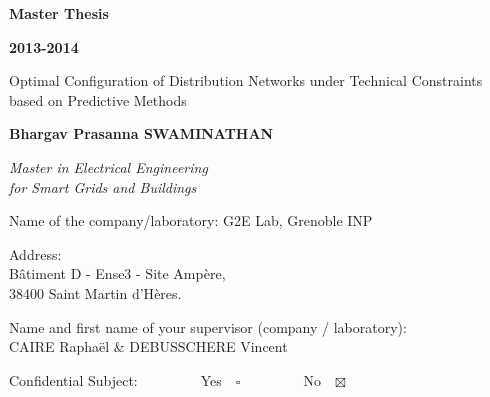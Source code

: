\documentclass{article}
\begin{document}
\thispagestyle{empty}
\begingroup
\centering
\begin{figure}[!h]
\centering
 \newlength\figureheight
    \newlength\figurewidth
    \setlength\figureheight{3.63cm}
    \setlength\figurewidth{5.53cm}
    
\end{figure}
 \fontsize {24pt}{24pt}\selectfont
{\bfseries Master Thesis\par}

\vspace*{.02\textheight}

 \fontsize {24pt}{24pt}\selectfont
{\bfseries 2013-2014\par}

\vspace*{.06\textheight}

 \fontsize {16pt}{24pt}\selectfont
{Optimal Configuration of Distribution Networks under Technical Constraints based on Predictive Methods\par}

\vspace*{.03\textheight}

 \fontsize {14pt}{24pt}\selectfont
{\bfseries Bhargav Prasanna SWAMINATHAN\par}

\vspace*{.06\textheight}

 \fontsize {24pt}{30pt}\selectfont
{\itshape Master in Electrical Engineering\\ for Smart Grids and Buildings\par}

\vspace*{.08\textheight}

\flushleft
{} \fontsize {14pt}{24pt}\selectfont
{Name of the company/laboratory: G2E Lab, Grenoble INP\par}

\vspace*{.04\textheight}

 \fontsize {14pt}{15pt}\selectfont
{Address:\\B{\^a}timent D - Ense3 - Site Amp{\`e}re,\\
38400 Saint Martin d'H{\`e}res.\par}

\vspace*{.03\textheight}

 \fontsize {14pt}{25pt}\selectfont
{Name and first name of your supervisor (company / laboratory):\\CAIRE Rapha{\"e}l \& DEBUSSCHERE Vincent\par}

\vspace*{.04\textheight}

 \fontsize {16pt}{50pt}\selectfont
{\color {red} Confidential Subject:\ \ \ \ \ \ \ \ \  Yes\ \  $\square$\ \ \ \ \ \ \ \ \  No\ \  $\boxtimes$ \par}

\endgroup
\end{document}
